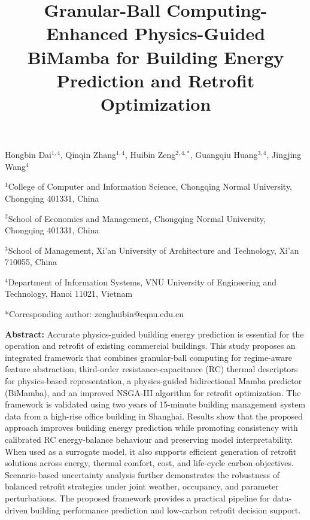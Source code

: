 \documentclass[11pt]{article}
\title{Granular-Ball Computing-Enhanced Physics-Guided BiMamba for Building Energy Prediction and Retrofit Optimization}
\author{}
\date{}
\begin{document}
\maketitle
\vspace{-3.2em}
\begin{center}
{\large Hongbin Dai$^{1,4}$, Qinqin Zhang$^{1,4}$, Huibin Zeng$^{2,4,*}$, Guangqiu Huang$^{3,4}$, Jingjing Wang$^{4}$}\\[0.5em]
\begin{minipage}{\textwidth}
\justifying
\setlength{\parindent}{0pt}
$^{1}$College of Computer and Information Science, Chongqing Normal University, Chongqing 401331, China\par
$^{2}$School of Economics and Management, Chongqing Normal University, Chongqing 401331, China\par
$^{3}$School of Management, Xi'an University of Architecture and Technology, Xi'an 710055, China\par
$^{4}$Department of Information Systems, VNU University of Engineering and Technology, Hanoi 11021, Vietnam\par
*Corresponding author: zenghuibin@cqnu.edu.cn
\end{minipage}
\end{center}

\noindent\textbf{Abstract:} Accurate physics-guided building energy prediction is essential for the operation and retrofit of existing commercial buildings. This study proposes an integrated framework that combines granular-ball computing for regime-aware feature abstraction, third-order resistance-capacitance (RC) thermal descriptors for physics-based representation, a physics-guided bidirectional Mamba predictor (BiMamba), and an improved NSGA-III algorithm for retrofit optimization. The framework is validated using two years of 15-minute building management system data from a high-rise office building in Shanghai. Results show that the proposed approach improves building energy prediction while promoting consistency with calibrated RC energy-balance behaviour and preserving model interpretability. When used as a surrogate model, it also supports efficient generation of retrofit solutions across energy, thermal comfort, cost, and life-cycle carbon objectives. Scenario-based uncertainty analysis further demonstrates the robustness of balanced retrofit strategies under joint weather, occupancy, and parameter perturbations. The proposed framework provides a practical pipeline for data-driven building performance prediction and low-carbon retrofit decision support.
\end{document}
